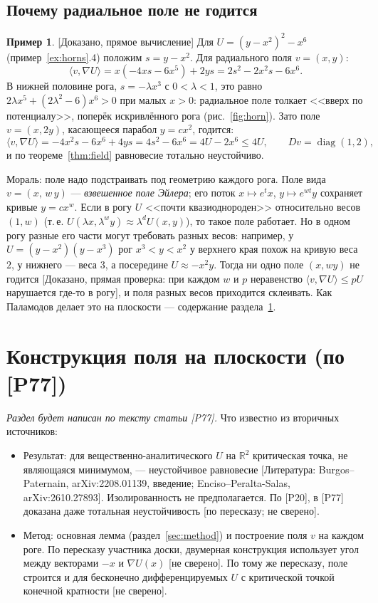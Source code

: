 \documentclass[11pt,a4paper]{article}
\theoremstyle{definition}
\newtheorem{example}[theorem]{Пример}
\newcommand{\R}{\mathbb R}
\newcommand{\mk}[1]{\textsf{[#1]}}
\newcommand{\term}[1]{\emph{#1}}
\begin{document}
\subsection{Почему радиальное поле не годится}

\begin{example}\label{ex:radial-fails}
\mk{Доказано, прямое вычисление} Для $U=(y-x^2)^2-x^6$ (пример~\ref{ex:horns}.4) положим
$s=y-x^2$. Для радиального поля $v=(x,y)$:
\[
\langle v,\nabla U\rangle=x(-4xs-6x^5)+2ys=2s^2-2x^2s-6x^6 .
\]
В нижней половине рога, $s=-\lambda x^3$ с $0<\lambda<1$, это равно $2\lambda x^5+(2\lambda^2-6)x^6>0$
при малых $x>0$: радиальное поле толкает <<вверх по потенциалу>>, поперёк искривлённого рога
(рис.~\ref{fig:horn}). Зато поле $v=(x,2y)$, касающееся парабол $y=cx^2$, годится:
\[
\langle v,\nabla U\rangle=-4x^2s-6x^6+4ys=4s^2-6x^6=4U-2x^6\le4U,\qquad Dv=\operatorname{diag}(1,2),
\]
и по теореме~\ref{thm:field} равновесие тотально неустойчиво.
\end{example}

Мораль: поле надо подстраивать под геометрию каждого рога. Поле вида
$v=(x,\,w\,y)$ --- \term{взвешенное поле Эйлера}; его поток $x\mapsto e^tx$, $y\mapsto e^{wt}y$
сохраняет кривые $y=cx^w$. Если в рогу $U$ <<почти квазиоднороден>> относительно весов $(1,w)$
(т.\,е. $U(\lambda x,\lambda^wy)\approx\lambda^dU(x,y)$), то такое поле работает. Но в одном
рогу разные его части могут требовать разных весов: например, у $U=(y-x^2)(y-x^3)$ рог
$x^3<y<x^2$ у верхнего края похож на кривую веса $2$, у нижнего --- веса $3$, а посередине
$U\approx-x^2y$. Тогда ни одно поле $(x,wy)$ не годится \mk{Доказано, прямая проверка: при
каждом $w$ и $p$ неравенство $\langle v,\nabla U\rangle\le pU$ нарушается где-то в рогу}, и поля
разных весов приходится склеивать. Как Паламодов делает это на плоскости --- содержание
раздела~\ref{sec:plane}.

\section{Конструкция поля на плоскости (по [P77])}\label{sec:plane}

\emph{Раздел будет написан по тексту статьи [P77].} Что известно из вторичных источников:

\begin{itemize}[leftmargin=*]
\item Результат: для вещественно-аналитического $U$ на $\R^2$ критическая точка, не являющаяся
минимумом, --- неустойчивое равновесие \mk{Литература: Burgos--Paternain, arXiv:2208.01139,
введение; Enciso--Peralta-Salas, arXiv:2610.27893}. Изолированность не предполагается. По
[P20], в [P77] доказана даже тотальная неустойчивость \mk{по пересказу; не сверено}.
\item Метод: основная лемма (раздел~\ref{sec:method}) и построение поля $v$ на каждом роге.
По пересказу участника доски, двумерная конструкция использует угол между векторами $-x$ и
$\nabla U(x)$ \mk{не сверено}. По тому же пересказу, поле строится и для бесконечно
дифференцируемых $U$ с критической точкой конечной кратности \mk{не сверено}.
\end{itemize}
\end{document}
